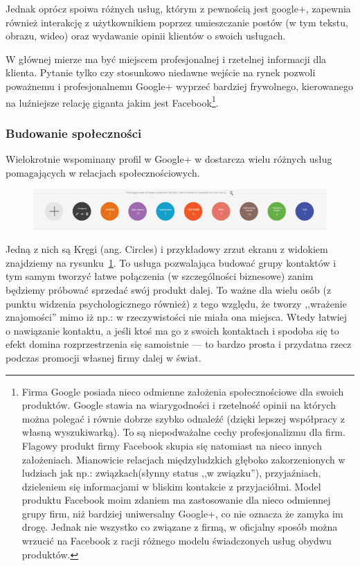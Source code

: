 \noindent Jednak oprócz spoiwa różnych usług, którym z pewnością jest google+, zapewnia również interakcję z użytkownikiem poprzez umieszczanie postów (w tym tekstu, obrazu, wideo) oraz wydawanie opinii klientów o swoich usługach. 

W głównej mierze ma być miejscem profesjonalnej i rzetelnej informacji dla klienta. Pytanie tylko czy stosunkowo niedawne wejście na rynek pozwoli poważnemu i profesjonalnemu Google+ wyprzeć bardziej frywolnego, kierowanego na luźniejsze relację giganta jakim jest Facebook\footnote{Firma Google posiada nieco odmienne założenia społecznościowe dla swoich produktów. Google stawia na wiarygodności i rzetelność opinii na których można polegać i równie dobrze szybko odnaleźć (dzięki lepszej współpracy z własną wyszukiwarką). To są niepodważalne cechy profesjonalizmu dla firm. 
Flagowy produkt firmy Facebook skupia się natomiast na nieco innych założeniach. Mianowicie relacjach międzyludzkich głęboko zakorzenionych w ludziach jak np.: związkach(słynny status ,,w związku''), przyjaźniach, dzieleniem się informacjami w bliskim kontakcie z przyjaciółmi. Model produktu Facebook moim zdaniem ma zastosowanie dla nieco odmiennej grupy firm, niż bardziej uniwersalny Google+, co nie oznacza że zamyka im drogę. Jednak nie wszystko co związane z firmą, w oficjalny sposób można wrzucić na Facebook z racji różnego modelu świadczonych usług obydwu produktów.}.


\subsubsection{Budowanie społeczności}
Wielokrotnie wspominany profil w Google+ w dostarcza wielu różnych usług pomagających w relacjach społecznościowych.

\begin{figure}[!h]
\centering
    \scalebox{0.25}
    {
        \includegraphics{images/google-plus-circles.png}
    }
    \label{fig:google-plus-circles}
\end{figure}

Jedną z nich są Kręgi (ang. Circles) i przykładowy zrzut ekranu z widokiem znajdziemy na rysunku~\ref{fig:google-plus-circles}. To usługa pozwalająca budować grupy kontaktów i tym samym tworzyć łatwe połączenia (w szczególności biznesowe) zanim będziemy próbować sprzedać swój produkt dalej. To ważne dla wielu osób (z punktu widzenia psychologicznego również) z tego względu, że tworzy ,,wrażenie znajomości'' mimo iż np.: w rzeczywistości nie miała ona miejsca.
Wtedy łatwiej o nawiązanie kontaktu, a jeśli ktoś ma go z swoich kontaktach i spodoba się to efekt domina rozprzestrzenia się samoistnie --- to bardzo prosta i przydatna rzecz podczas promocji własnej firmy dalej w świat.

